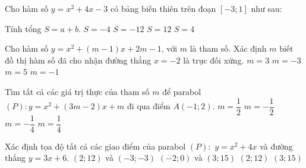 \begin{ex}%
	Cho hàm số $y=x^2+4x-3$ có bảng biến thiên trên đoạn $[-3; 1]$ như sau:
	\begin{center}
	\end{center}
	Tính tổng $S=a+b$.
	\choice
	{\True $S=-4$}
	{$S=-12$}
	{$S=12$}
	{$S=4$}
\end{ex}

\begin{ex}%
	Cho hàm số $y=x^2+(m-1)x+2m-1$, với $m$ là tham số. Xác định $m$ biết đồ thị hàm số đã cho nhận đường thẳng $x=-2$ là trục đối xứng.
	\choice
	{$m=3$}
	{$m=-3$}
	{\True $m=5$}
	{$m=-1$}
\end{ex}

\begin{ex}%
	Tìm tất cả các giá trị thực của tham số $m$ để parabol $(P): y=x^2+(3m-2)x+m$ đi qua điểm $A(-1; 2)$.
	\choice
	{\True $m=\dfrac{1}{2}$}
	{$m=-\dfrac{1}{2}$}
	{$m=-\dfrac{1}{4}$}
	{$m=\dfrac{1}{4}$}
\end{ex}

\begin{ex}%
	Xác định tọa độ tất cả các giao điểm của parabol $(P):$ $y=x^2+4x$ và đường thẳng $y=3x+6$.
	\choice
	{\True $(2; 12)$ và $(-3; -3)$}
	{$(-2; 0)$ và $(3; 15)$}
	{$(2; 12)$}
	{$(3; 15)$}
\end{ex}

